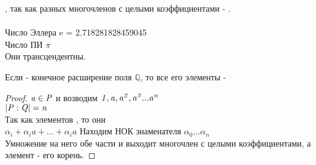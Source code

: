 , так как разных многочленов с целыми
коэффициентами - . \\
 \\
Число Эллера {\bk e} = 2.718281828459045 \\
Число ПИ $\pi $ \\
Они трансцендентны.\\

\begin{theorem}
	Если  - конечное расширение поля $\mathbb {Q}$, то все его элементы -
\end{theorem}

\begin{proof}
	$\mathit {a \in P}$ и возводим $\mathit {1, a, a^2, a^3...a^n}$ \\
	$\mathit {|P:Q| = n}$ \\
	Так как элементов , то они  \\
	$\alpha_{i} + \alpha_{i}a + ... + \alpha_{i}a$ %
	Находим НОК знаменателя $\alpha_{0} ... \alpha_{n}$ \\
	Умножение на него обе части и выходит многочлен с целыми коэффициентами, а
	элемент  - его корень.
\end{proof}